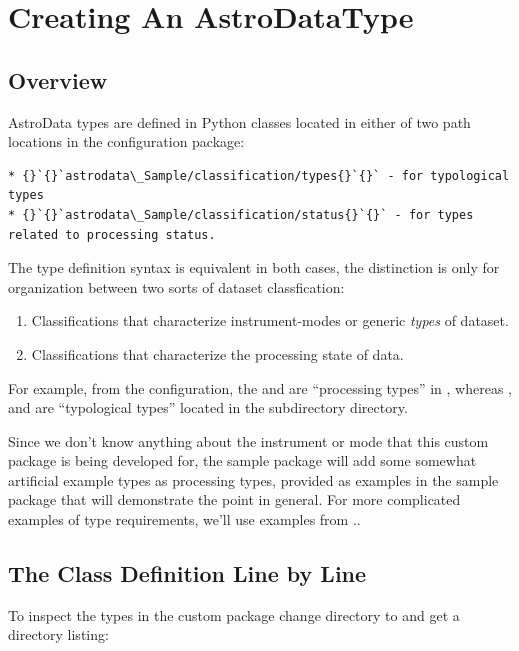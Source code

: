 \documentclass[letterpaper,10pt,english]{sphinxmanual}
\begin{document}
\section{Creating An AstroDataType}
\label{creatingAnAstroDataType:creating-an-astrodatatype}\label{creatingAnAstroDataType::doc}

\subsection{Overview}
\label{creatingAnAstroDataType:overview}
AstroData types are defined in Python classes located in either of two path
locations in the configuration package:

\begin{Verbatim}[commandchars=\\\{\}]
* {}`{}`astrodata\_Sample/classification/types{}`{}` - for typological types
* {}`{}`astrodata\_Sample/classification/status{}`{}` - for types related to processing status.
\end{Verbatim}

The type definition syntax is equivalent in both cases,
the distinction is only for organization between two
sorts of dataset classfication:
\begin{enumerate}
\item {} 
Classifications that characterize instrument-modes or generic \emph{types}
of dataset.

\item {} 
Classifications that characterize the processing state of data.

\end{enumerate}

For example, from the  configuration, the  and
 are ``processing types'' in , whereas
,  and  are ``typological types'' located in the
 subdirectory directory.

Since we don't know anything about the instrument or mode that this  custom package is
being developed for, the sample package will add some somewhat artificial example types
as processing types,  provided as examples in the sample package that will demonstrate
the point in general. For more complicated examples of type requirements, we'll
use examples from ..


\subsection{The Class Definition Line by Line}
\label{creatingAnAstroDataType:the-class-definition-line-by-line}
To inspect the types in the custom package change
directory to  and get a directory
listing:
\end{document}
